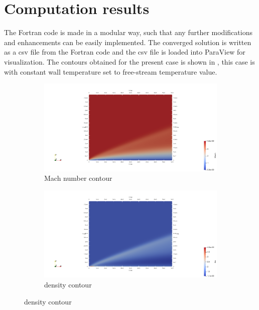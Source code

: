\documentclass[conf]{new-aiaa}
\begin{document}
\section{Computation results}
\par The Fortran code is made in a modular way, such that any further modifications
and enhancements can be easily implemented. The converged solution is written
as a csv file from the Fortran code and the csv file is loaded into ParaView
for visualization. The contours obtained for the present case is shown in
, this case is with constant wall temperature set to free-stream
temperature value.

\begin{figure}[!htb]
    \centering
    \begin{subfigure}{0.45\textwidth}
        \includegraphics[width=\textwidth]{supportingFiles/solution_files_flatplate_constant_Twall/mach.png}
        \caption{Mach number contour}
    \end{subfigure}
    \hfill
    \begin{subfigure}{0.45\textwidth}
        \includegraphics[width=\textwidth]{supportingFiles/solution_files_flatplate_constant_Twall/density.png}
        \caption{density contour}
    \end{subfigure}

\end{figure}
\end{document}
